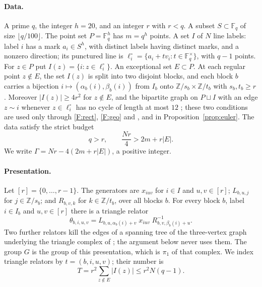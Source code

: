 \documentclass[11pt]{article}
\theoremstyle{definition}
\theoremstyle{remark}
\numberwithin{equation}{section}
\newcommand{\F}{\mathbb F}
\newcommand{\Z}{\mathbb Z}
\begin{document}
\paragraph{Data.} A prime $q$, the integer $h=20$, and an integer $r$ with $r<q$. A subset $S\subset\F_q$ of size $\lfloor q/100\rfloor$. The point set $P=\F_q^h$ has $m=q^h$ points. A set $I$ of $N$ line labels: label $i$ has a mark $a_i\in S^h$, with distinct labels having distinct marks, and a nonzero direction; its punctured line is $\ell_i^\circ=\{a_i+tv_i:t\in\F_q^\times\}$, with $q-1$ points. For $z\in P$ put $I(z)=\{i:z\in\ell_i^\circ\}$. An exceptional set $E\subset P$. At each regular point $z\notin E$, the set $I(z)$ is split into two disjoint blocks, and each block $b$ carries a bijection $i\mapsto(\alpha_b(i),\beta_b(i))$ from $I_b$ onto $\Z/s_b\times\Z/t_b$ with $s_b,t_b\ge r$. Moreover $|I(z)|\ge4r^2$ for $z\notin E$, and the bipartite graph on $P\sqcup I$ with an edge $z\sim i$ whenever $z\in\ell_i^\circ$ has no cycle of length at most $12$ \cite[Lemma~2.2]{OAI252}; these two conditions are used only through \ref{F:rect}, \ref{F:geo} and \cite[Lemma~2.3]{OAI252}, and in Proposition~\ref{prop:euler}. The data satisfy the strict budget \cite[(2.2)]{OAI252}
\begin{equation}\label{eq:budget}
 q>r,\qquad \frac{Nr}{4}>2m+r|E|.
\end{equation}
We write $\Gamma=Nr-4(2m+r|E|)$, a positive integer.

\paragraph{Presentation.} Let $[r]=\{0,\dots,r-1\}$. The generators are $x_{iuv}$ for $i\in I$ and $u,v\in[r]$; $L_{b,u,j}$ for $j\in\Z/s_b$; and $R_{b,v,k}$ for $k\in\Z/t_b$, over all blocks $b$. For every block $b$, label $i\in I_b$ and $u,v\in[r]$ there is a triangle relator
\begin{equation}\label{eq:triangle}
 \theta_{b,i,u,v}=L_{b,u,\alpha_b(i)+v}\;x_{iuv}\;R_{b,v,\beta_b(i)+u}^{-1}.
\end{equation}
Two further relators kill the edges of a spanning tree of the three-vertex graph underlying the triangle complex of \cite{OAI252}; the argument below never uses them. The group $G$ is the group of this presentation, which is $\pi_1$ of that complex. We index triangle relators by $t=(b,i,u,v)$; their number is
\begin{equation}\label{eq:T}
 T=r^2\sum_{z\notin E}|I(z)|\le r^2N(q-1).
\end{equation}
\end{document}
